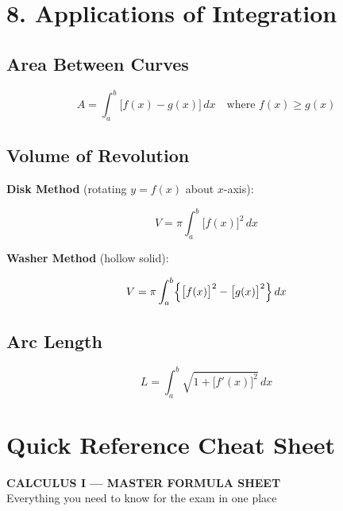 \documentclass[12pt]{article}
\begin{document}
\section{8. Applications of Integration}

\subsection{Area Between Curves}
\begin{formulabox}
\[
  A = \int_a^b \bigl[f(x) - g(x)\bigr]\,dx \quad \text{where } f(x) \geq g(x)
\]
\end{formulabox}

\subsection{Volume of Revolution}

\textbf{Disk Method} (rotating $y = f(x)$ about $x$-axis):
\begin{formulabox}
\[
  V = \pi\int_a^b \bigl[f(x)\bigr]^2\,dx
\]
\end{formulabox}

\textbf{Washer Method} (hollow solid):
\begin{formulabox}
\[
  V = \pi\int_a^b \Bigl\{\bigl[f(x)\bigr]^2 - \bigl[g(x)\bigr]^2\Bigr\}\,dx
\]
\end{formulabox}

\subsection{Arc Length}
\begin{formulabox}
\[
  L = \int_a^b \sqrt{1 + \bigl[f'(x)\bigr]^2}\,dx
\]
\end{formulabox}

\section{Quick Reference Cheat Sheet}

\begin{tcolorbox}[
  enhanced, arc=0pt, boxrule=0pt,
  colback=primary, colframe=primary,
  left=14pt, right=14pt, top=10pt, bottom=10pt,
  borderline south={3pt}{0pt}{accent},
]
  \centering
  {\large\bfseries\color{white} CALCULUS I — MASTER FORMULA SHEET}\\[4pt]
  {\small\color{lightbg} Everything you need to know for the exam in one place}
\end{tcolorbox}
\end{document}
